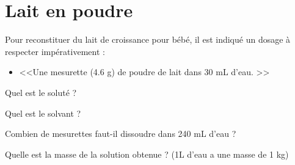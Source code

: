 \section{Lait en poudre}

Pour reconstituer du lait de croissance pour bébé, il est indiqué un dosage à respecter impérativement :
\begin{itemize}
	\item <<Une mesurette (\num{4.6} g) de poudre de lait dans 30 mL d'eau. >>	
\end{itemize}

\begin{questions}
	\question Quel est le soluté ?
	
	\question Quel est le solvant ?
	
	\question Combien de mesurettes faut-il dissoudre dans 240 mL d'eau ?
	
	\question Quelle est la masse de la solution obtenue ? (1L d'eau a une masse de 1 kg)
\end{questions}